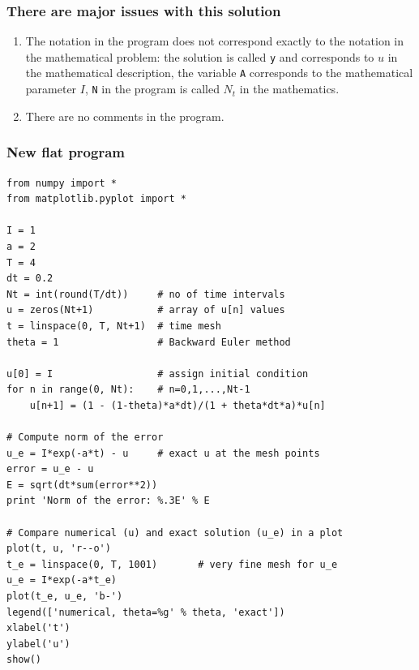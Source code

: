 \documentclass{beamer}
\begin{document}
\begin{frame}
\frametitle{There are major issues with this solution}

\begin{enumerate}
\item The notation in the program does not correspond exactly to
   the notation in the mathematical problem: the solution is called
   \texttt{y} and corresponds to $u$ in the mathematical description,
   the variable \texttt{A} corresponds to the mathematical parameter $I$,
   \texttt{N} in the program is called $N_t$ in the mathematics.

\item There are no comments in the program.
\end{enumerate}

\noindent
\end{frame}

\begin{frame}
\frametitle{New flat program}

\begin{verbatim}
from numpy import *
from matplotlib.pyplot import *

I = 1
a = 2
T = 4
dt = 0.2
Nt = int(round(T/dt))     # no of time intervals
u = zeros(Nt+1)           # array of u[n] values
t = linspace(0, T, Nt+1)  # time mesh
theta = 1                 # Backward Euler method

u[0] = I                  # assign initial condition
for n in range(0, Nt):    # n=0,1,...,Nt-1
    u[n+1] = (1 - (1-theta)*a*dt)/(1 + theta*dt*a)*u[n]

# Compute norm of the error
u_e = I*exp(-a*t) - u     # exact u at the mesh points
error = u_e - u
E = sqrt(dt*sum(error**2))
print 'Norm of the error: %.3E' % E

# Compare numerical (u) and exact solution (u_e) in a plot
plot(t, u, 'r--o')
t_e = linspace(0, T, 1001)       # very fine mesh for u_e
u_e = I*exp(-a*t_e)
plot(t_e, u_e, 'b-')
legend(['numerical, theta=%g' % theta, 'exact'])
xlabel('t')
ylabel('u')
show()
\end{verbatim}
\end{frame}
\end{document}
